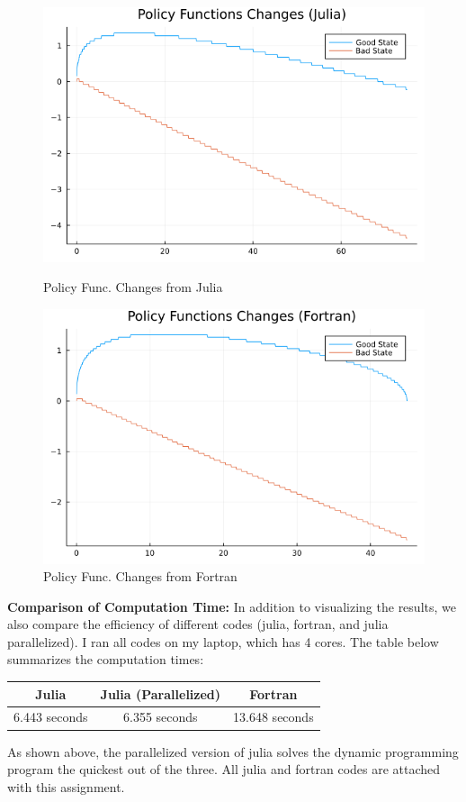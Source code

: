 \documentclass[12pt]{article}
\begin{document}
\begin{figure} [!htbp]
    \centering
    \begin{minipage}{0.45\textwidth}
        \centering
        \includegraphics[width=\textwidth]{02_Policy_Functions_Changes.png}
        \caption{Policy Func. Changes from Julia}
    \end{minipage}\hfill
    \begin{minipage}{0.45\textwidth}
        \centering
        \includegraphics[width=\textwidth]{02_Policy_Functions_Changes_Fortran.png} 
        \caption{Policy Func. Changes from Fortran}
    \end{minipage}
\end{figure}

\newpage
\noindent\textbf{Comparison of Computation Time: } In addition to visualizing the results, we also compare the efficiency of different codes (julia, fortran, and julia parallelized). I ran all codes on my laptop, which has 4 cores. The table below summarizes the computation times:

\begin{table}[!htbp]
    \centering
    \begin{tabular}{c|c|c}
         Julia & Julia (Parallelized) & Fortran \\
         \hline
         6.443 seconds &  6.355 seconds & 13.648 seconds
    \end{tabular}
\end{table}
\noindent As shown above, the parallelized version of julia solves the dynamic programming program the quickest out of the three. All julia and fortran codes are attached with this assignment. 
\end{document}
